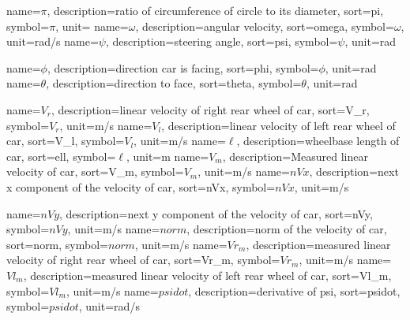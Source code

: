 
{
  name={\ensuremath{\pi}},
  description={ratio of circumference of circle to its diameter},
  sort=pi,
  symbol={\ensuremath{\pi}},
  unit={}
}
{
  name={\ensuremath{\omega}},
  description={angular velocity},
  sort=omega,
  symbol={\ensuremath{\omega}},
  unit={\si{rad/s}}
}
{
  name={\ensuremath{\psi}},
  description={steering angle},
  sort=psi,
  symbol={\ensuremath{\psi}},
  unit={\si{rad}}
}

{
  name={\ensuremath{\phi}},
  description={direction car is facing},
  sort=phi,
  symbol={\ensuremath{\phi}},
  unit={\si{rad}}
}
{
  name={\ensuremath{\theta}},
  description={direction to face},
  sort=theta,
  symbol={\ensuremath{\theta}},
  unit={\si{rad}}
}

{
  name={\ensuremath{V_r}},
  description={linear velocity of right rear wheel of car},
  sort=V_r,
  symbol={\ensuremath{V_r}},
  unit={\si{m/s}}
}
{
  name={\ensuremath{V_l}},
  description={linear velocity of left rear wheel of car},
  sort=V_l,
  symbol={\ensuremath{V_l}},
  unit={\si{m/s}}
}
{
  name={\ensuremath{\ell}},
  description={wheelbase length of car},
  sort=ell,
  symbol={\ensuremath{\ell}},
  unit={\si{m}}
}
{
  name={\ensuremath{V_m}},
  description={Measured linear velocity of car},
  sort=V_m,
  symbol={\ensuremath{V_m}},
  unit={\si{m/s}}
}
{
  name={\ensuremath{nVx}},
  description={next x component of the velocity of car},
  sort=nVx,
  symbol={\ensuremath{nVx}},
  unit={\si{m/s}}
}

{
  name={\ensuremath{nVy}},
  description={next y component of the velocity of car},
  sort=nVy,
  symbol={\ensuremath{nVy}},
  unit={\si{m/s}}
}
{
  name={\ensuremath{norm}},
  description={norm of the velocity of car},
  sort=norm,
  symbol={\ensuremath{norm}},
  unit={\si{m/s}}
}
{
  name={\ensuremath{Vr_m}},
  description={measured linear velocity of right rear wheel of car},
  sort=Vr_m,
  symbol={\ensuremath{Vr_m}},
  unit={\si{m/s}}
}
{
  name={\ensuremath{Vl_m}},
  description={measured linear velocity of left rear wheel of car},
  sort=Vl_m,
  symbol={\ensuremath{Vl_m}},
  unit={\si{m/s}}
}
{
  name={\ensuremath{psidot}},
  description={derivative of psi},
  sort=psidot,
  symbol={\ensuremath{psidot}},
  unit={\si{rad/s}}
}
